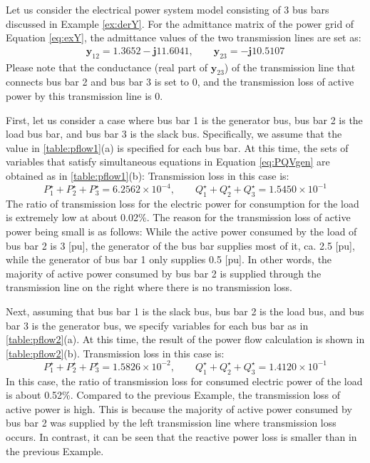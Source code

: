 \documentclass[tombow,dvipdfmx]{corona-a5-1.1}
\begin{document}
\begin{例}\label{ex:pf3bus}
Let us consider the electrical power system model consisting of 3 bus bars discussed in Example \ref{ex:derY}.
For the admittance matrix of the power grid of Equation \ref{eq:exY}, the admittance values of the two transmission lines are set as:
\begin{align}\label{eq:rightlossless}
\bm{y}_{12} = 1.3652 - \bm{j} 11.6041, \qquad
\bm{y}_{23} =  - \bm{j} 10.5107
\end{align}
Please note that the conductance (real part of $\bm{y}_{23}$) of the transmission line that connects bus bar 2 and bus bar 3 is set to 0, and the transmission loss of active power by this transmission line is 0. 

First, let us consider a case where bus bar 1 is the generator bus, bus bar 2 is the load bus bar, and bus bar 3 is the slack bus.
Specifically, we assume that the value in \ref{table:pflow1}(a) is specified for each bus bar.
At this time, the sets of variables that satisfy simultaneous equations in Equation \ref{eq:PQVgen} are obtained as in \ref{table:pflow1}(b):
Transmission loss in this case is:
\[
P_1^{\star} + P_2^{\star} + P_3^{\star} = 6.2562\times 10^{-4},
\qquad 
Q_1^{\star} + Q_2^{\star} + Q_3^{\star} =1.5450  \times 10^{-1}
\]
The ratio of transmission loss for the electric power for consumption for the load is extremely low at about 0.02\%.
The reason for the transmission loss of active power being small is as follows: While the active power consumed by the load of bus bar 2 is 3 [pu], the generator of the bus bar supplies most of it, ca. 2.5 [pu], while the generator of bus bar 1 only supplies 0.5 [pu].
In other words, the majority of active power consumed by bus bar 2 is supplied through the transmission line on the right where there is no transmission loss. 

Next, assuming that bus bar 1 is the slack bus, bus bar 2 is the load bus, and bus bar 3 is the generator bus, we specify variables for each bus bar as in \ref{table:pflow2}(a).
At this time, the result of the power flow calculation is shown in \ref{table:pflow2}(b).
Transmission loss in this case is:
\[
P_1^{\star} + P_2^{\star} + P_3^{\star} = 1.5826 \times 10^{-2},
\qquad 
Q_1^{\star} + Q_2^{\star} + Q_3^{\star} =1.4120  \times 10^{-1}
\]
In this case, the ratio of transmission loss for consumed electric power of the load is about 0.52\%.
Compared to the previous Example, the transmission loss of active power is high.
This is because the majority of active power consumed by bus bar 2 was supplied by the left transmission line where transmission loss occurs.
In contrast, it can be seen that the reactive power loss is smaller than in the previous Example.
\end{例}
\end{document}
